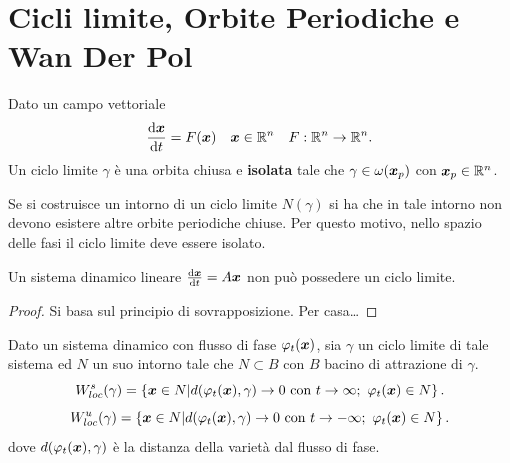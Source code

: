 \section{Cicli limite, Orbite Periodiche e Wan Der Pol}%
\label{sub:Cicli limite}
\begin{defn}
    Dato un campo vettoriale 
    \[
	\frac{\text{d} \boldsymbol{x}}{\text{d} t} = F(\boldsymbol{x}) \quad  \boldsymbol{x}\in \mathbb{R}^n \quad  F:\mathbb{R}^n\to \mathbb{R}^n
    .\] 
    Un ciclo limite $\gamma$ è una orbita chiusa e \textbf{isolata} tale che $\gamma  \in \omega (\boldsymbol{x}_p)$ con $\boldsymbol{x}_p \in \mathbb{R}^n$. 
\end{defn}
\noindent
Se si costruisce un intorno di un ciclo limite $N(\gamma)$ si ha che in tale intorno non devono esistere altre orbite periodiche chiuse. Per questo motivo, nello spazio delle fasi il ciclo limite deve essere isolato.\\

\begin{thm}
Un sistema dinamico lineare $\frac{\text{d} \boldsymbol{x}}{\text{d} t} = A \boldsymbol{x}$ non può possedere un ciclo limite.
\end{thm}
\noindent
\begin{proof}
    Si basa sul principio di sovrapposizione. 
    Per casa\ldots
\end{proof}
\begin{defn}
    Dato un sistema dinamico con flusso di fase $\varphi_t(\boldsymbol{x})$, sia $\gamma$ un ciclo limite di tale sistema ed $N$ un suo intorno tale che $N \subset B$ con $B$ bacino di attrazione di $\gamma$.
    \[
	W_{loc}^s(\gamma) = \left\{\boldsymbol{x}\in N| d(\varphi_t(\boldsymbol{x}) , \gamma)\to 0 \text{ con } t\to \infty; \ \varphi_t (\boldsymbol{x}) \in N\right\}
    .\] 
    \[
	W_{loc}^u(\gamma) = \left\{\boldsymbol{x}\in N| d(\varphi_t(\boldsymbol{x}) , \gamma)\to 0 \text{ con } t\to -\infty; \ \varphi_t (\boldsymbol{x}) \in N \right\}
    .\] 
    dove $d(\varphi_t(\boldsymbol{x}), \gamma)$ è la distanza della varietà dal flusso di fase.
\end{defn}
\noindent
